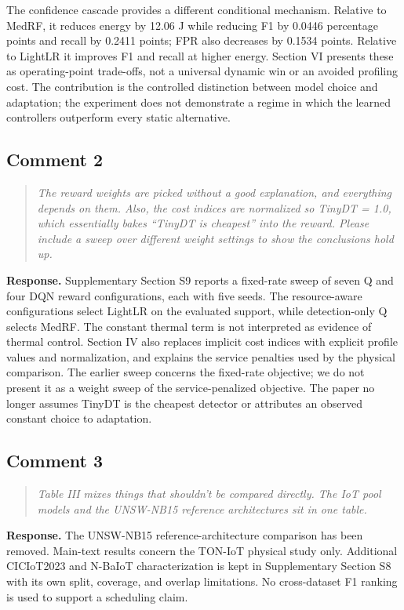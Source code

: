\documentclass[11pt,a4paper]{article}
\newenvironment{comment}{\begin{quote}\small\itshape}{\end{quote}}
\newcommand{\response}{\noindent\textbf{Response.} }
\begin{document}
The confidence cascade provides a different conditional mechanism. Relative to MedRF, it reduces energy by 12.06 J while reducing F1 by 0.0446 percentage points and recall by 0.2411 points; FPR also decreases by 0.1534 points. Relative to LightLR it improves F1 and recall at higher energy. Section VI presents these as operating-point trade-offs, not a universal dynamic win or an avoided profiling cost. The contribution is the controlled distinction between model choice and adaptation; the experiment does not demonstrate a regime in which the learned controllers outperform every static alternative.

\subsection*{Comment 2}
\begin{comment}
The reward weights are picked without a good explanation, and everything depends on them. Also, the cost indices are normalized so TinyDT = 1.0, which essentially bakes ``TinyDT is cheapest'' into the reward. Please include a sweep over different weight settings to show the conclusions hold up.
\end{comment}
\response Supplementary Section S9 reports a fixed-rate sweep of seven Q and four DQN reward configurations, each with five seeds. The resource-aware configurations select LightLR on the evaluated support, while detection-only Q selects MedRF. The constant thermal term is not interpreted as evidence of thermal control. Section IV also replaces implicit cost indices with explicit profile values and normalization, and explains the service penalties used by the physical comparison. The earlier sweep concerns the fixed-rate objective; we do not present it as a weight sweep of the service-penalized objective. The paper no longer assumes TinyDT is the cheapest detector or attributes an observed constant choice to adaptation.

\subsection*{Comment 3}
\begin{comment}
Table III mixes things that shouldn't be compared directly. The IoT pool models and the UNSW-NB15 reference architectures sit in one table.
\end{comment}
\response The UNSW-NB15 reference-architecture comparison has been removed. Main-text results concern the TON-IoT physical study only. Additional CICIoT2023 and N-BaIoT characterization is kept in Supplementary Section S8 with its own split, coverage, and overlap limitations. No cross-dataset F1 ranking is used to support a scheduling claim.
\end{document}
